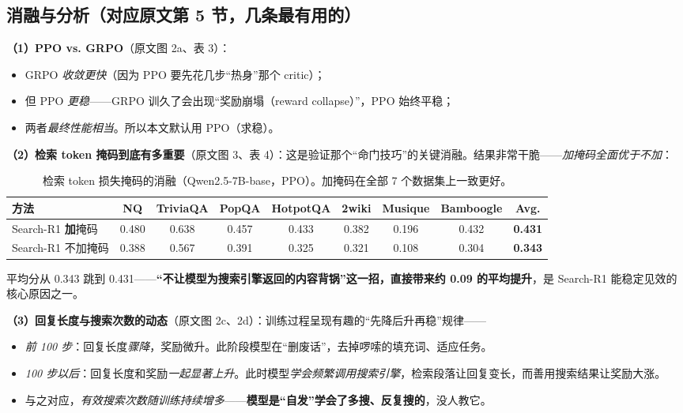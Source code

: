 \documentclass[11pt,UTF8,fontset=fandol]{ctexart}
\begin{document}
\subsection{消融与分析（对应原文第 5 节，几条最有用的）}

\textbf{（1）PPO vs. GRPO}（原文图 2a、表 3）：
\begin{itemize}[leftmargin=1.4em]
\item GRPO \emph{收敛更快}（因为 PPO 要先花几步“热身”那个 critic）；
\item 但 PPO \emph{更稳}——GRPO 训久了会出现“奖励崩塌（reward collapse）”，PPO 始终平稳；
\item 两者\emph{最终性能相当}。所以本文默认用 PPO（求稳）。
\end{itemize}

\textbf{（2）检索 token 掩码到底有多重要}（原文图 3、表 4）：这是验证那个“命门技巧”的关键消融。结果非常干脆——\emph{加掩码全面优于不加}：

\begin{table}[H]\centering
\caption{检索 token 损失掩码的消融（Qwen2.5-7B-base，PPO）。加掩码在全部 7 个数据集上一致更好。}
\label{tab:mask}
\small
\begin{tabular}{lccccccc>{\bfseries}c}
\toprule
方法 & NQ & TriviaQA & PopQA & HotpotQA & 2wiki & Musique & Bamboogle & Avg. \\
\midrule
Search-R1 \textbf{加}掩码   & 0.480 & 0.638 & 0.457 & 0.433 & 0.382 & 0.196 & 0.432 & 0.431 \\
Search-R1 不加掩码 & 0.388 & 0.567 & 0.391 & 0.325 & 0.321 & 0.108 & 0.304 & 0.343 \\
\bottomrule
\end{tabular}
\end{table}
平均分从 0.343 跳到 0.431——\textbf{“不让模型为搜索引擎返回的内容背锅”这一招，直接带来约 0.09 的平均提升}，是 Search-R1 能稳定见效的核心原因之一。

\textbf{（3）回复长度与搜索次数的动态}（原文图 2c、2d）：训练过程呈现有趣的“先降后升再稳”规律——
\begin{itemize}[leftmargin=1.4em]
\item \emph{前 100 步}：回复长度\emph{骤降}，奖励微升。此阶段模型在“删废话”，去掉啰嗦的填充词、适应任务。
\item \emph{100 步以后}：回复长度和奖励\emph{一起显著上升}。此时模型\emph{学会频繁调用搜索引擎}，检索段落让回复变长，而善用搜索结果让奖励大涨。
\item 与之对应，\emph{有效搜索次数随训练持续增多}——\textbf{模型是“自发”学会了多搜、反复搜的}，没人教它。
\end{itemize}
\end{document}
